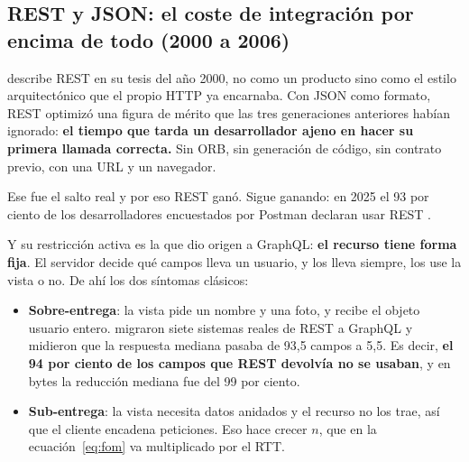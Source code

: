 \documentclass[11pt,letterpaper]{article}
\begin{document}
\subsection*{REST y JSON: el coste de integración por encima de todo (2000 a 2006)}

\textcite{fielding2000} describe REST en su tesis del año 2000, no como un
producto sino como el estilo arquitectónico que el propio HTTP ya encarnaba.
Con JSON como formato, REST optimizó una figura de mérito que las tres
generaciones anteriores habían ignorado: \textbf{el tiempo que tarda un
desarrollador ajeno en hacer su primera llamada correcta.} Sin ORB, sin
generación de código, sin contrato previo, con una URL y un navegador.

Ese fue el salto real y por eso REST ganó. Sigue ganando: en 2025 el 93 por
ciento de los desarrolladores encuestados por Postman declaran usar REST
\parencite{postman2025}.

Y su restricción activa es la que dio origen a GraphQL: \textbf{el recurso
tiene forma fija}. El servidor decide qué campos lleva un usuario, y los lleva
siempre, los use la vista o no. De ahí los dos síntomas clásicos:

\begin{itemize}
\item \textbf{Sobre-entrega}: la vista pide un nombre y una foto, y recibe el
  objeto usuario entero. \textcite{brito2019} migraron siete sistemas reales
  de REST a GraphQL y midieron que la respuesta mediana pasaba de 93,5 campos
  a 5,5. Es decir, \textbf{el 94 por ciento de los campos que REST devolvía no
  se usaban}, y en bytes la reducción mediana fue del 99 por ciento.
\item \textbf{Sub-entrega}: la vista necesita datos anidados y el recurso no
  los trae, así que el cliente encadena peticiones. Eso hace crecer $n$, que en
  la ecuación~\eqref{eq:fom} va multiplicado por el RTT.
\end{itemize}
\end{document}
